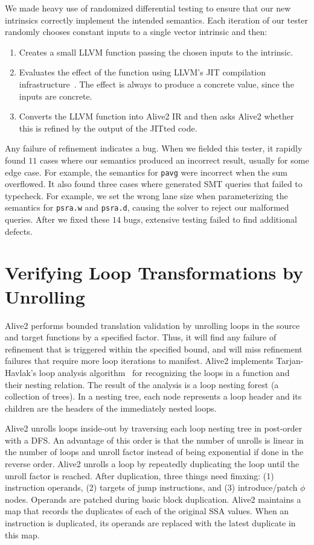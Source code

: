 We made heavy use of randomized differential testing to ensure that
our new intrinsics correctly implement the intended semantics.
%
Each iteration of our tester randomly chooses constant inputs to a
single vector intrinsic and then:
%
\begin{enumerate}
\item
  Creates a small LLVM function passing the chosen inputs to the
  intrinsic.
\item
  Evaluates the effect of the function using LLVM's JIT compilation
  infrastructure~\cite{orc}. The effect is always to produce a
  concrete value, since the inputs are concrete.
\item
  Converts the LLVM function into Alive2 IR and then asks Alive2
  whether this is refined by the output of the JITted code.
\end{enumerate}
%
Any failure of refinement indicates a bug.
%
When we fielded this tester, it rapidly found $11$ cases
where our semantics produced an incorrect result, usually for
some edge case.
%
For example, the semantics for \texttt{pavg} were incorrect when the
sum overflowed.
%
It also found three cases where \minotaur{} generated SMT queries that
failed to typecheck.
%
For example, we set the wrong lane size when parameterizing the
semantics for \texttt{psra.w} and \texttt{psra.d}, causing the solver
to reject our malformed queries.
%
After we fixed these $14$ bugs, extensive testing failed to find
additional defects.

\section {Verifying Loop Transformations by Unrolling}

Alive2 performs bounded translation validation by unrolling loops in
the source and target functions by a specified factor. Thus, it will
find any failure of refinement that is triggered within the specified
bound, and will miss refinement failures that require more loop
iterations to manifest. Alive2 implements Tarjan-Havlak’s loop
analysis algorithm~\cite{havlak} for recognizing the loops in a function and
their nesting relation. The result of the analysis is a loop nesting
forest (a collection of trees). In a nesting tree, each node
represents a loop header and its children are the headers of the
immediately nested loops.

Alive2 unrolls loops inside-out by traversing each loop nesting tree
in post-order with a DFS. An advantage of this order is that the
number of unrolls is linear in the number of loops and unroll factor
instead of being exponential if done in the reverse order.
%
Alive2 unrolls a loop by repeatedly duplicating the loop until the
unroll factor is reached. After duplication, three things need fimxing:
%
(1) instruction operands,
%
(2) targets of jump instructions, and
%
(3) introduce/patch $\phi$ nodes.
%
Operands are patched during basic block duplication. Alive2 maintains
a map that records the duplicates of each of the original SSA values.
When an instruction is duplicated, its operands are replaced with the
latest duplicate in this map.

